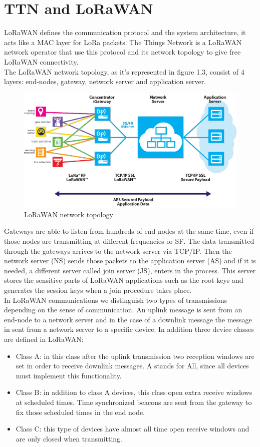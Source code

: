 \section{TTN and LoRaWAN}
\label{sec:f-ttnandlora}
LoRaWAN defines the communication protocol and the system
architecture, it acts like a MAC layer for LoRa packets. The Things
Network is a LoRaWAN network operator that use this protocol and its
network topology to give free LoRaWAN connectivity. \\
The LoRaWAN network topology, as it's represented in figure 1.3,
consist of 4 layers: end-nodes, gateway, network server and application
server.
\begin{figure}[htbp]
\includegraphics[width=\linewidth]{ttnarch.png}
\caption{LoRaWAN network topology}
\end{figure}
Gateways are able to listen from hundreds of end nodes at the same
time, even if those nodes are transmitting at different frequencies or SF.
The data transmitted through the gateways arrives to the network server
via TCP/IP. Then the network server (NS) sends those packets to the
application server (AS) and if it is needed, a different server called join
server (JS), enters in the process. This server stores the sensitive parts
of LoRaWAN applications such as the root keys and generates the
session keys when a join procedure takes place.\\
In LoRaWAN communications we distinguish two types of transmissions
depending on the sense of communication. An uplink message is sent
from an end-node to a network server and in the case of a downlink
message the message in sent from a network server to a specific device.
In addition three device classes are defined in LoRaWAN:
\begin{itemize}
    \item Class A: in this class after the uplink transmission two reception
windows are set in order to receive downlink messages. A stands
for All, since all devices must implement this functionality.
    \item Class B: in addition to class A devices, this class open extra
receive windows at scheduled times. Time synchronized beacons
are sent from the gateway to fix those scheduled times in the end
node.
    \item Class C: this type of devices have almost all time open receive
windows and are only closed when transmitting.
\end{itemize}
